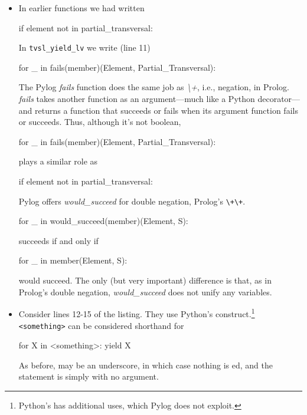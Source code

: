 \begin{itemize}
\item In earlier functions we had written 
\begin{python}
if element not in partial_transversal:
\end{python}
In \texttt{tvsl\_yield\_lv} we write (line 11)
\begin{python}
for _ in fails(member)(Element, Partial_Transversal):
\end{python}
The Pylog \textit{fails} function does the same job as \textit{\textbackslash+}, i.e., negation, in Prolog. \textit{fails} takes another function as an argument---much like a Python decorator---and returns a function that succeeds or fails when its argument function fails or succeeds. Thus, although it's not boolean,
\begin{python}
for _ in fails(member)(Element, Partial_Transversal):
\end{python} 
plays a similar role as
\begin{python}
if element not in partial_transversal:
\end{python}
\smallv

Pylog offers \textit{would\_succeed} for double negation, Prolog's \texttt{\textbackslash+\textbackslash+}.
\begin{python}
for _ in would_succeed(member)(Element, S):
\end{python} 
succeeds if and only if
\begin{python}
for _ in member(Element, S):
\end{python} 
would succeed. The only (but very important) difference is that, as in  Prolog's double negation, \textit{would\_succeed} does not unify any variables.
\smallv

\item Consider lines 12-15 of the listing. They use Python's   construct.\footnote{Python's   has additional uses, which Pylog does not exploit.} \texttt{ <something>} can be considered shorthand for
\begin{python}
for X in <something>:
  yield X
\end{python}

As before,  may be an underscore, in which case nothing is ed, and the  statement is simply  with no argument.


\end{itemize}
